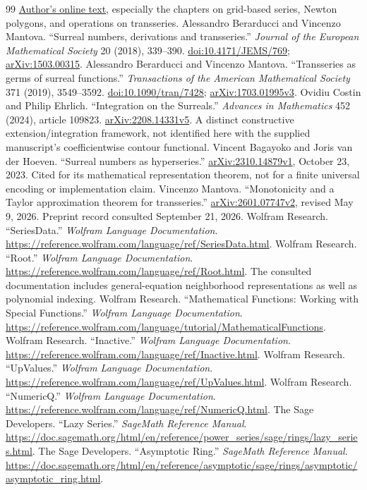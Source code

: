 \documentclass[11pt,letterpaper]{article}
\theoremstyle{definition}
\numberwithin{equation}{section}
\begin{document}
\begin{thebibliography}{99}
\href{https://www.texmacs.org/joris/ln/ln.html}{Author's online text}, especially the chapters on grid-based series, Newton polygons, and operations on transseries.
Alessandro Berarducci and Vincenzo Mantova. ``Surreal numbers, derivations and transseries.''
\emph{Journal of the European Mathematical Society} 20 (2018), 339--390.
\href{https://doi.org/10.4171/JEMS/769}{doi:10.4171/JEMS/769};
\href{https://arxiv.org/abs/1503.00315}{arXiv:1503.00315}.
Alessandro Berarducci and Vincenzo Mantova. ``Transseries as germs of surreal functions.''
\emph{Transactions of the American Mathematical Society} 371 (2019), 3549--3592.
\href{https://doi.org/10.1090/tran/7428}{doi:10.1090/tran/7428};
\href{https://arxiv.org/abs/1703.01995}{arXiv:1703.01995v3}.
Ovidiu Costin and Philip Ehrlich. ``Integration on the Surreals.''
\emph{Advances in Mathematics} 452 (2024), article 109823.
\href{https://arxiv.org/abs/2208.14331}{arXiv:2208.14331v5}.
A distinct constructive extension/integration framework, not identified here with the supplied manuscript's coefficientwise contour functional.
Vincent Bagayoko and Joris van der Hoeven. ``Surreal numbers as hyperseries.''
\href{https://arxiv.org/abs/2310.14879}{arXiv:2310.14879v1}, October 23, 2023.
Cited for its mathematical representation theorem, not for a finite universal encoding or implementation claim.
Vincenzo Mantova. ``Monotonicity and a Taylor approximation theorem for transseries.''
\href{https://arxiv.org/abs/2601.07747}{arXiv:2601.07747v2}, revised May 9, 2026.
Preprint record consulted September 21, 2026.
Wolfram Research. ``SeriesData.'' \emph{Wolfram Language Documentation}.
\url{https://reference.wolfram.com/language/ref/SeriesData.html}.
Wolfram Research. ``Root.'' \emph{Wolfram Language Documentation}.
\url{https://reference.wolfram.com/language/ref/Root.html}.
The consulted documentation includes general-equation neighborhood representations as well as polynomial indexing.
Wolfram Research. ``Mathematical Functions: Working with Special Functions.''
\emph{Wolfram Language Documentation}.
\url{https://reference.wolfram.com/language/tutorial/MathematicalFunctions}.
Wolfram Research. ``Inactive.'' \emph{Wolfram Language Documentation}.
\url{https://reference.wolfram.com/language/ref/Inactive.html}.
Wolfram Research. ``UpValues.'' \emph{Wolfram Language Documentation}.
\url{https://reference.wolfram.com/language/ref/UpValues.html}.
Wolfram Research. ``NumericQ.'' \emph{Wolfram Language Documentation}.
\url{https://reference.wolfram.com/language/ref/NumericQ.html}.
The Sage Developers. ``Lazy Series.'' \emph{SageMath Reference Manual}.
\url{https://doc.sagemath.org/html/en/reference/power_series/sage/rings/lazy_series.html}.
The Sage Developers. ``Asymptotic Ring.'' \emph{SageMath Reference Manual}.
\url{https://doc.sagemath.org/html/en/reference/asymptotic/sage/rings/asymptotic/asymptotic_ring.html}.
\end{thebibliography}
\endgroup
\end{document}
